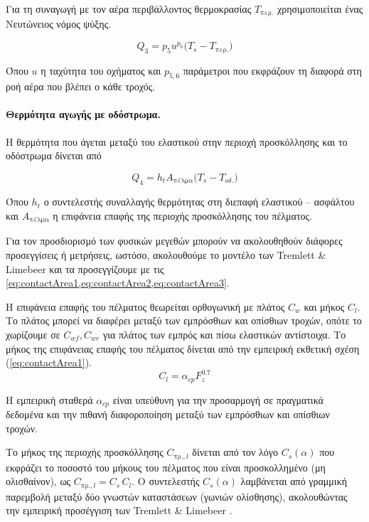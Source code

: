 Για τη συναγωγή με τον αέρα περιβάλλοντος θερμοκρασίας $T_{\text{περ.}}$ χρησιμοποιείται ένας
Νευτώνειος νόμος ψύξης.

\begin{equation}
    Q_3 = p_5u^{p_6}\bigl(T_s - T_{\text{περ.}}\bigr)
    \label{eq:Q3}
\end{equation}


Όπου $u$ η ταχύτητα του οχήματος και $p_{5,6}$ παράμετροι που εκφράζουν τη διαφορά στη ροή
αέρα που βλέπει ο κάθε τροχός.

\paragraph{Θερμότητα αγωγής με οδόστρωμα.}

Η θερμότητα που άγεται μεταξύ του ελαστικού στην περιοχή προσκόλλησης και το οδόστρωμα δίνεται από

\begin{equation}
    Q_4 = h_tA_{\text{πέλμα}}\bigl(T_s - T_{οδ.}\bigr)
    \label{eq:Q4}
\end{equation}

Όπου $h_t$ ο συντελεστής συναλλαγής θερμότητας στη διεπαφή ελαστικού -- ασφάλτου και $A_{\text{πέλμα}}$
η επιφάνεια επαφής της περιοχής προσκόλλησης του πέλματος.

Για τον προσδιορισμό των φυσικών μεγεθών μπορούν να ακολουθηθούν διάφορες προσεγγίσεις ή μετρήσεις, ωστόσο,
ακολουθούμε το μοντέλο των Tremlett \& Limebeer \cite{Tremlett2016} και τα προσεγγίζουμε με τις 
\cref{eq:contactArea1,eq:contactArea2,eq:contactArea3}.

Η επιφάνεια επαφής του πέλματος θεωρείται ορθογωνική με πλάτος $C_w$ και μήκος $C_l$. Το πλάτος μπορεί 
να διαφέρει μεταξύ των εμπρόσθιων και οπίσθιων τροχών, οπότε το χωρίζουμε σε $C_{wf},C_{wr}$ για πλάτος
των εμπρός και πίσω ελαστικών αντίστοιχα.
Το μήκος της επιφάνειας επαφής του πέλματος δίνεται από την εμπειρική εκθετική σχέση 
(\ref{eq:contactArea1}).
\begin{equation}
    C_l = \alpha_{cp}F_z^{0.7}
    \label{eq:contactArea1}
\end{equation}

Η εμπειρική σταθερά $\alpha_{cp}$ είναι υπεύθυνη για την προσαρμογή σε πραγματικά δεδομένα και την πιθανή διαφοροποίηση
μεταξύ των εμπρόσθιων και οπίσθιων τροχών.

Το μήκος της περιοχής προσκόλλησης $C_{\text{πρ.},l}$ δίνεται από τον λόγο $C_s(\alpha)$ 
που εκφράζει το ποσοστό του μήκους του πέλματος που είναι προσκολλημένο (μη ολισθαίνον), ως $C_{\text{πρ.},l} = C_s\,C_l$. Ο συντελεστής $C_s(\alpha)$
λαμβάνεται από γραμμική παρεμβολή μεταξύ δύο γνωστών καταστάσεων (γωνιών ολίσθησης), ακολουθώντας την εμπειρική προσέγγιση των Tremlett \& Limebeer \cite{Tremlett2016}.


